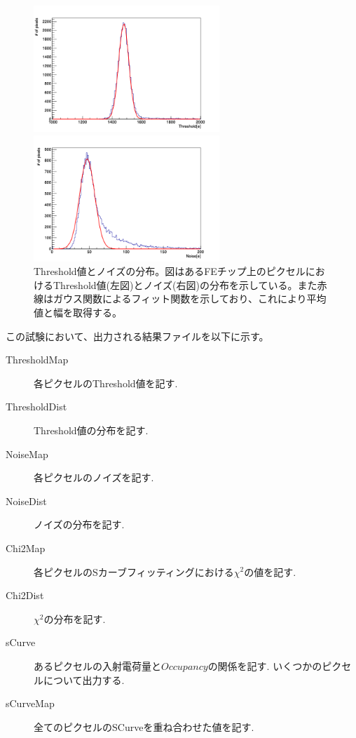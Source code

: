 \begin{figure}[bpt]\centering
  \begin{minipage}{0.45\hsize}
    \includegraphics[width=7cm]{./data/analysis_result/Threshold_mean_dist}
  \end{minipage}
  \begin{minipage}{0.45\hsize}
    \includegraphics[width=7cm]{./data/analysis_result/Threshold_noise_dist}
  \end{minipage}
  \caption[Threshold値とノイズの分布。]{Threshold値とノイズの分布。図はあるFEチップ上のピクセルにおけるThreshold値(左図)とノイズ(右図)の分布を示している。また赤線はガウス関数によるフィット関数を示しており、これにより平均値と幅を取得する。}
  \label{threshold_mean_sigma}
\end{figure}

この試験において、出力される結果ファイルを以下に示す。
\begin{description}
  \item [ThresholdMap] 各ピクセルのThreshold値を記す.
  \item [ThresholdDist] Threshold値の分布を記す.
  \item [NoiseMap] 各ピクセルのノイズを記す.
  \item [NoiseDist] ノイズの分布を記す. 
  \item [Chi2Map] 各ピクセルのSカーブフィッティングにおける$\chi^2$の値を記す.
  \item [Chi2Dist] $\chi^2$の分布を記す.
  \item [sCurve] あるピクセルの入射電荷量と$Occupancy$の関係を記す. いくつかのピクセルについて出力する.
  \item [sCurveMap] 全てのピクセルのSCurveを重ね合わせた値を記す.
\end{description}

